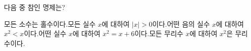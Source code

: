 다음 중 참인 명제는?
\begin{choicesv}{모든 소수는 홀수이다.}{모든 실수 $x$에 대하여 $|x|>0$이다.}{어떤 음의 실수 $x$에 대하여 $x^2<x$이다.}{어떤 실수 $x$에 대하여 $x^2=x+6$이다.}{모든 무리수 $x$에 대하여 $x^2$은 무리수이다.}\end{choicesv}

